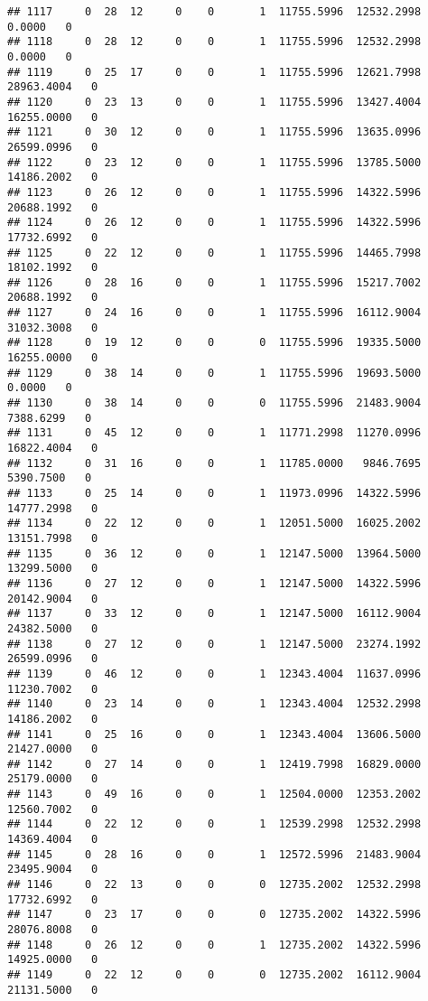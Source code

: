 \documentclass[
]{article}
\begin{document}
\begin{enumerate}
\begin{verbatim}
## 1117     0  28  12     0    0       1  11755.5996  12532.2998      0.0000   0
## 1118     0  28  12     0    0       1  11755.5996  12532.2998      0.0000   0
## 1119     0  25  17     0    0       1  11755.5996  12621.7998  28963.4004   0
## 1120     0  23  13     0    0       1  11755.5996  13427.4004  16255.0000   0
## 1121     0  30  12     0    0       1  11755.5996  13635.0996  26599.0996   0
## 1122     0  23  12     0    0       1  11755.5996  13785.5000  14186.2002   0
## 1123     0  26  12     0    0       1  11755.5996  14322.5996  20688.1992   0
## 1124     0  26  12     0    0       1  11755.5996  14322.5996  17732.6992   0
## 1125     0  22  12     0    0       1  11755.5996  14465.7998  18102.1992   0
## 1126     0  28  16     0    0       1  11755.5996  15217.7002  20688.1992   0
## 1127     0  24  16     0    0       1  11755.5996  16112.9004  31032.3008   0
## 1128     0  19  12     0    0       0  11755.5996  19335.5000  16255.0000   0
## 1129     0  38  14     0    0       1  11755.5996  19693.5000      0.0000   0
## 1130     0  38  14     0    0       0  11755.5996  21483.9004   7388.6299   0
## 1131     0  45  12     0    0       1  11771.2998  11270.0996  16822.4004   0
## 1132     0  31  16     0    0       1  11785.0000   9846.7695   5390.7500   0
## 1133     0  25  14     0    0       1  11973.0996  14322.5996  14777.2998   0
## 1134     0  22  12     0    0       1  12051.5000  16025.2002  13151.7998   0
## 1135     0  36  12     0    0       1  12147.5000  13964.5000  13299.5000   0
## 1136     0  27  12     0    0       1  12147.5000  14322.5996  20142.9004   0
## 1137     0  33  12     0    0       1  12147.5000  16112.9004  24382.5000   0
## 1138     0  27  12     0    0       1  12147.5000  23274.1992  26599.0996   0
## 1139     0  46  12     0    0       1  12343.4004  11637.0996  11230.7002   0
## 1140     0  23  14     0    0       1  12343.4004  12532.2998  14186.2002   0
## 1141     0  25  16     0    0       1  12343.4004  13606.5000  21427.0000   0
## 1142     0  27  14     0    0       1  12419.7998  16829.0000  25179.0000   0
## 1143     0  49  16     0    0       1  12504.0000  12353.2002  12560.7002   0
## 1144     0  22  12     0    0       1  12539.2998  12532.2998  14369.4004   0
## 1145     0  28  16     0    0       1  12572.5996  21483.9004  23495.9004   0
## 1146     0  22  13     0    0       0  12735.2002  12532.2998  17732.6992   0
## 1147     0  23  17     0    0       0  12735.2002  14322.5996  28076.8008   0
## 1148     0  26  12     0    0       1  12735.2002  14322.5996  14925.0000   0
## 1149     0  22  12     0    0       0  12735.2002  16112.9004  21131.5000   0

\end{verbatim}
\end{enumerate}
\end{document}
